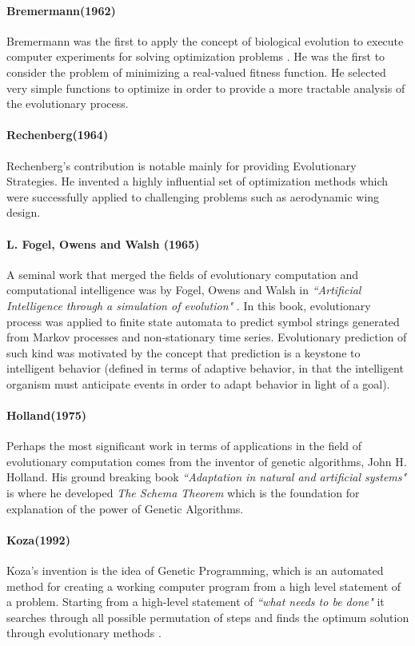 \documentclass[letterpaper]{article}
\numberwithin{equation}{section}
\begin{document}
\paragraph{Bremermann(1962)}
Bremermann was the first to apply the concept of biological evolution to execute computer experiments for solving optimization problems \cite{bremermann1962}. He was the first to consider the problem of minimizing a real-valued fitness function. He selected very simple functions to optimize in order to provide a more tractable analysis of the evolutionary process.

\paragraph{Rechenberg(1964)}
Rechenberg's contribution is notable mainly for providing Evolutionary Strategies. He invented a highly influential set of optimization methods which were successfully applied to challenging problems such as aerodynamic wing design. \cite{rechenberg1973}

\paragraph{L. Fogel, Owens and Walsh (1965)}
A seminal work that merged the fields of evolutionary computation and computational intelligence was by Fogel, Owens and Walsh in \textsl{``Artificial Intelligence through a simulation of evolution"} \cite{fogel1966}. In this book, evolutionary process was applied to finite state automata to predict symbol strings generated from Markov processes and non-stationary time series. Evolutionary prediction of such kind was motivated by the concept that prediction is a keystone to intelligent behavior (defined in terms of adaptive behavior, in that the intelligent organism must anticipate events in order to adapt behavior in light of a goal). 

\paragraph{Holland(1975)}
Perhaps the most significant work in terms of applications in the field of evolutionary computation comes from the inventor of genetic algorithms, John H. Holland. His ground breaking book \textsl{``Adaptation in natural and artificial systems"} \cite{holland1975} is where he developed \textit{The Schema Theorem} which is the foundation for explanation of the power of Genetic Algorithms.

\paragraph{Koza(1992)}
Koza's invention is the idea of Genetic Programming, which is an automated method for creating a working computer program from a high level statement of a problem. Starting from a high-level statement of \textsl{``what needs to be done"} it searches through all possible permutation of steps and finds the optimum solution through evolutionary methods \cite{koza1992}.
\end{document}

